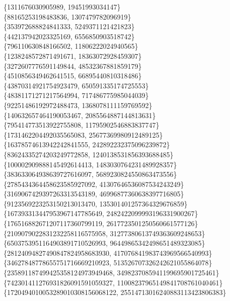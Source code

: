 \documentclass[fleqn]{article}
\begin{document}
    \{1311676030905989, 19451993034147\} \\
    \{88165253198483836, 1307479782096919\} \\
    \{353972688824841333, 5249371121421823\} \\
    \{442137942023325169, 6556850903518742\} \\
    \{796110630848166502, 11806222024940565\} \\
    \{1238248572871491671, 18363072928459307\} \\
    \{3272607776591149844, 48532367881859179\} \\
    \{4510856349462641515, 66895440810318486\} \\
    \{43870314921754923479, 650591335174725553\} \\
    \{48381171271217564994, 717486775985044039\} \\
    \{92251486192972488473, 1368078111159769592\} \\
    \{140632657464190053467, 2085564887144813631\} \\
    \{795414773513922755808, 11795902546883837747\} \\
    \{1731462204492035565083, 25677369980912489125\} \\
    \{16378574613942242841555, 242892232375096239872\} \\
    \{83624335274203249772858, 1240138531856393688485\} \\
    \{100002909888145492614413, 1483030764231489928357\} \\
    \{383633064938639727616097, 5689230824550863473556\} \\
    \{2785434364458623585927092, 41307646536087534243249\} \\
    \{3169067429397263313543189, 46996877360638397716805\} \\
    \{9123569223253150213013470, 135301401257364329676859\} \\
    \{167393313447953967147785649, 2482422099993196331900267\} \\
    \{176516882671207117360799119, 2617723501250560661577126\} \\
    \{2109079022831232258116575958, 31277380613749363609248653\} \\
    \{6503753951164903891710526993, 96449865342498651489323085\} \\
    \{28124094827490847824958683930, 417076841983743969566540993\} \\
    \{34627848778655751716669210923, 513526707326242621055864078\} \\
    \{235891187499425358124973949468, 3498237085941199695901725461\} \\
    \{742301411276931826091591059327, 11008237965149841708761040461\} \\
    \{1720494010053289010308156068122, 25514713016240883113423806383\} \\
\end{document}
